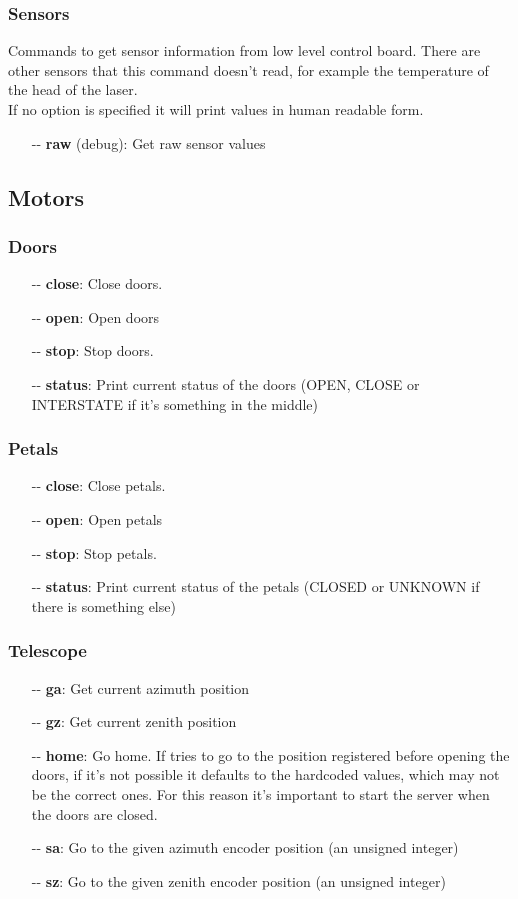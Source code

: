 \documentclass[letterpaper, 10 pt]{article}
\begin{document}
\subsubsection{Sensors}
Commands to get sensor information from low level control board. There are other sensors that this command doesn't read, for example the temperature of the head of the laser.\\
If no option is specified it will print values in human readable form.
\begin{itemize}
	\item[-{}-] \textbf{raw} (debug): Get raw sensor values
\end{itemize}

\subsection{Motors}
\subsubsection{Doors}
\begin{itemize}
	\item[-{}-] \textbf{close}: Close doors.
	\item[-{}-] \textbf{open}: Open doors
	\item[-{}-] \textbf{stop}: Stop doors. 
	\item[-{}-] \textbf{status}: Print current status of the doors (OPEN, CLOSE or INTERSTATE if it's something in the middle)
\end{itemize}
\subsubsection{Petals}
\begin{itemize}
	\item[-{}-] \textbf{close}: Close petals.
	\item[-{}-] \textbf{open}: Open petals
	\item[-{}-] \textbf{stop}: Stop petals. 
	\item[-{}-] \textbf{status}: Print current status of the petals (CLOSED or UNKNOWN if there is something else)
\end{itemize}
\subsubsection{Telescope}
\begin{itemize}
	\item[-{}-] \textbf{ga}: Get current azimuth position
	\item[-{}-] \textbf{gz}: Get current zenith position
	\item[-{}-] \textbf{home}: Go home. If tries to go to the position registered before opening the doors, if it's not possible it defaults to the hardcoded values, which may not be the correct ones. For this reason it's important to start the server when the doors are closed.
	\item[-{}-] \textbf{sa}: Go to the given azimuth encoder position (an unsigned integer)
	\item[-{}-] \textbf{sz}: Go to the given zenith encoder position (an unsigned integer)
\end{itemize}
\end{document}
